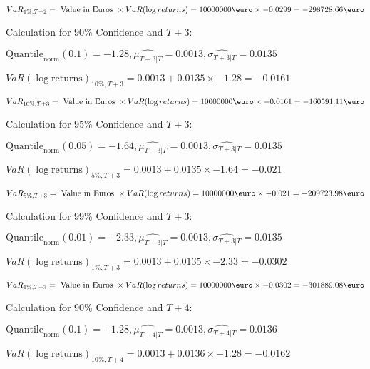 \indent\indent $VaR_{1\%, T + 2} = \text{ Value in Euros } \times VaR(\log returns) = 10 000 000 \text{\euro} \times-0.0299 = -298728.66 \text{\euro}$\newline




Calculation for 90\% Confidence and $T+3$:

\indent\indent $\text{Quantile}_\text{norm}(0.1) = -1.28,\hat{\mu_{T+3|T}} = 0.0013, \hat{\sigma_{T+3|T}} = 0.0135$

\indent\indent $VaR(\log \text{returns})_{10\%, T + 3} = 0.0013 + 0.0135\times-1.28 = -0.0161$

\indent\indent $VaR_{10\%, T + 3} = \text{ Value in Euros } \times VaR(\log returns) = 10 000 000 \text{\euro} \times-0.0161 = -160591.11 \text{\euro}$\newline




Calculation for 95\% Confidence and $T+3$:

\indent\indent $\text{Quantile}_\text{norm}(0.05) = -1.64,\hat{\mu_{T+3|T}} = 0.0013, \hat{\sigma_{T+3|T}} = 0.0135$

\indent\indent $VaR(\log \text{returns})_{5\%, T + 3} = 0.0013 + 0.0135\times-1.64 = -0.021$

\indent\indent $VaR_{5\%, T + 3} = \text{ Value in Euros } \times VaR(\log returns) = 10 000 000 \text{\euro} \times-0.021 = -209723.98 \text{\euro}$\newline




Calculation for 99\% Confidence and $T+3$:

\indent\indent $\text{Quantile}_\text{norm}(0.01) = -2.33,\hat{\mu_{T+3|T}} = 0.0013, \hat{\sigma_{T+3|T}} = 0.0135$

\indent\indent $VaR(\log \text{returns})_{1\%, T + 3} = 0.0013 + 0.0135\times-2.33 = -0.0302$

\indent\indent $VaR_{1\%, T + 3} = \text{ Value in Euros } \times VaR(\log returns) = 10 000 000 \text{\euro} \times-0.0302 = -301889.08 \text{\euro}$\newline




Calculation for 90\% Confidence and $T+4$:

\indent\indent $\text{Quantile}_\text{norm}(0.1) = -1.28,\hat{\mu_{T+4|T}} = 0.0013, \hat{\sigma_{T+4|T}} = 0.0136$

\indent\indent $VaR(\log \text{returns})_{10\%, T + 4} = 0.0013 + 0.0136\times-1.28 = -0.0162$

